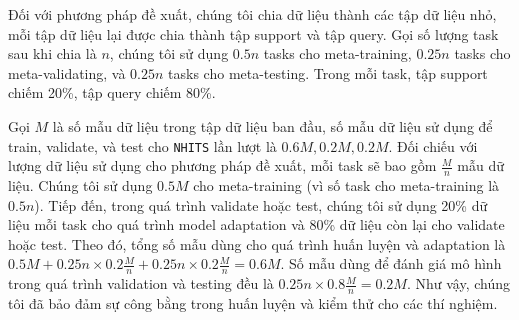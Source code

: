 \documentclass[aps,prb,groupedaddress,twocolumn,showpacs,dvipdfmx,superscriptaddress,pdftex]{revtex4-2}
\begin{document}

\vspace{2mm}

Đối với phương pháp đề xuất, chúng tôi chia dữ liệu thành các tập dữ liệu nhỏ, mỗi tập dữ liệu lại được chia thành tập support và tập query. Gọi số lượng task sau khi chia là $n$, chúng tôi sử dụng $0.5n$ tasks cho meta-training, $0.25n$ tasks cho meta-validating, và $0.25n$ tasks cho meta-testing. Trong mỗi task, tập support chiếm 20\%, tập query chiếm 80\%.


\vspace{2mm}

Gọi $M$ là số mẫu dữ liệu trong tập dữ liệu ban đầu, số mẫu dữ liệu sử dụng để train, validate, và test cho \verb|NHITS| lần lượt là $0.6M, 0.2M, 0.2M$. Đối chiếu với lượng dữ liệu sử dụng cho phương pháp đề xuất, mỗi task sẽ bao gồm $\frac{M}{n}$ mẫu dữ liệu. Chúng tôi sử dụng $0.5M$ cho meta-training (vì số task cho meta-training là $0.5n$). Tiếp đến, trong quá trình validate hoặc test, chúng tôi sử dụng 20\% dữ liệu mỗi task cho quá trình model adaptation và 80\% dữ liệu còn lại cho validate hoặc test. Theo đó, tổng số mẫu dùng cho quá trình huấn luyện và adaptation là $0.5M + 0.25n \times 0.2\frac{M}{n} + 0.25n \times 0.2\frac{M}{n} = 0.6M$. Số mẫu dùng để đánh giá mô hình trong quá trình validation và testing đều là $0.25n \times 0.8\frac{M}{n} = 0.2M$. Như vậy, chúng tôi đã bảo đảm sự công bằng trong huấn luyện và kiểm thử cho các thí nghiệm.

\end{document}
